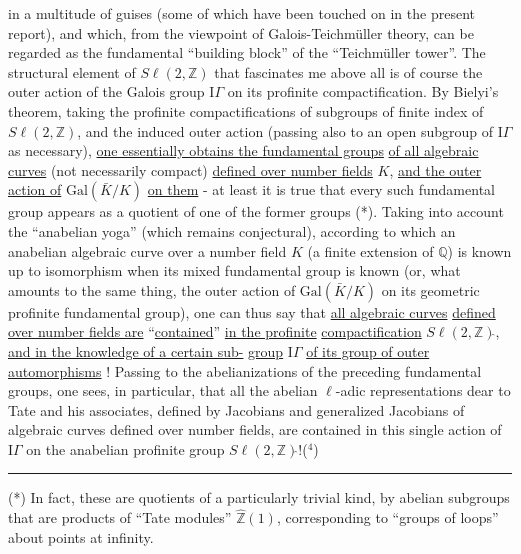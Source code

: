 
in a multitude of guises (some of which have been touched on
in the present report), and which, from the viewpoint of
Galois-Teichmüller theory, can be regarded as the fundamental
``building block'' of the ``Teichmüller tower''. The structural
element of $S\ell(2,\mathbb{Z})$ that fascinates me above all is of course
the outer action of the Galois group $\mathrm{I}\!\Gamma$ on its profinite
compactification. By Bielyi's theorem, taking the profinite
compactifications of subgroups of finite index of $S\ell(2,\mathbb{Z})$, and the induced
outer action (passing also to an open subgroup of $\mathrm{I}\!\Gamma$
as necessary), \uline{one essentially obtains the fundamental groups}
\uline{of all algebraic curves} (not necessarily compact)
\uline{defined over number fields} $K$, \uline{and the outer action of}
$\mathrm{Gal}(\bar{K}/K)$ \uline{on them} - at least it is true that every such fundamental
group appears as a quotient of one of the former groups (*).
Taking into account the ``anabelian yoga'' (which remains conjectural),
according to which an anabelian algebraic curve over a number field $K$
(a finite extension of $\mathbb{Q}$) is known up to isomorphism when
its mixed fundamental group is known (or, what amounts to the same thing,
the outer action of $\mathrm{Gal}(\bar{K}/K)$ on its geometric profinite
fundamental group), one can thus say that \uline{all algebraic curves}
\uline{defined over number fields are} ``\uline{contained}'' \uline{in the profinite}
\uline{compactification} $S\ell(2,\mathbb{Z})\hat{}$, \uline{and in the knowledge of a certain sub-}%
\uline{group} $\mathrm{I}\!\Gamma$ \uline{of its group of outer automorphisms} !
Passing to the abelianizations of the preceding fundamental groups, one sees,
in particular, that all the abelian $\ell$-adic representations dear
to Tate and his associates, defined by Jacobians and generalized
Jacobians of algebraic curves defined over number fields,
are contained in this single action of $\mathrm{I}\!\Gamma$ on the anabelian profinite
group $S\ell(2,\mathbb{Z})\hat{}$!($^{4}$)

\rule{5cm}{0.4pt}

(*) In fact, these are quotients of a particularly trivial
kind, by abelian subgroups that are products of ``Tate modules''
$\hat{\mathbb{Z}}(1)$, corresponding to ``groups of loops'' about points at infinity.


